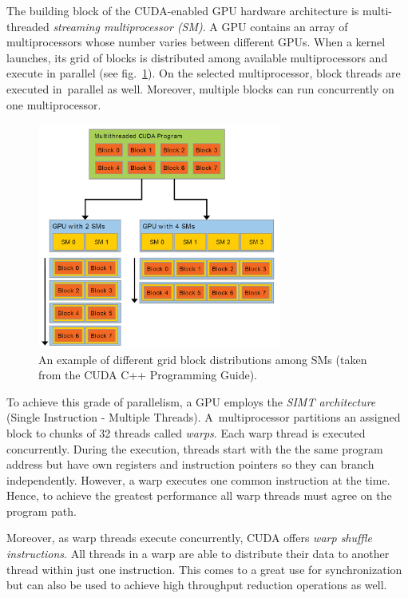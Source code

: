 The building block of the CUDA-enabled GPU hardware architecture is multi-threaded \emph{streaming multiprocessor (SM)}. A GPU contains an array of multiprocessors whose number varies between different GPUs. When a kernel launches, its grid of blocks is distributed among available multiprocessors and execute in parallel (see fig.~\ref{fig02:SM}). On the selected multiprocessor, block threads are executed in~parallel as well. Moreover, multiple blocks can run concurrently on one multiprocessor.

\begin{figure}\centering
	\includegraphics[width=8cm]{img/SM}
	\caption{An example of different grid block distributions among SMs (taken from the CUDA C++ Programming Guide).}
	\label{fig02:SM}
\end{figure}

To achieve this grade of parallelism, a GPU employs the \emph{SIMT architecture} (Single Instruction - Multiple Threads). A~multiprocessor partitions an assigned block to chunks of 32 threads called \emph{warps}. Each warp thread is executed concurrently. During the execution, threads start with the the same program address but have own registers and instruction pointers so they can branch independently. However, a warp executes one common instruction at the time. Hence, to achieve the greatest performance all warp threads must agree on the program path.

Moreover, as warp threads execute concurrently, CUDA offers \emph{warp shuffle instructions}. All threads in a warp are able to distribute their data to another thread within just one instruction. This comes to a great use for synchronization but can also be used to achieve high throughput reduction operations as well.


